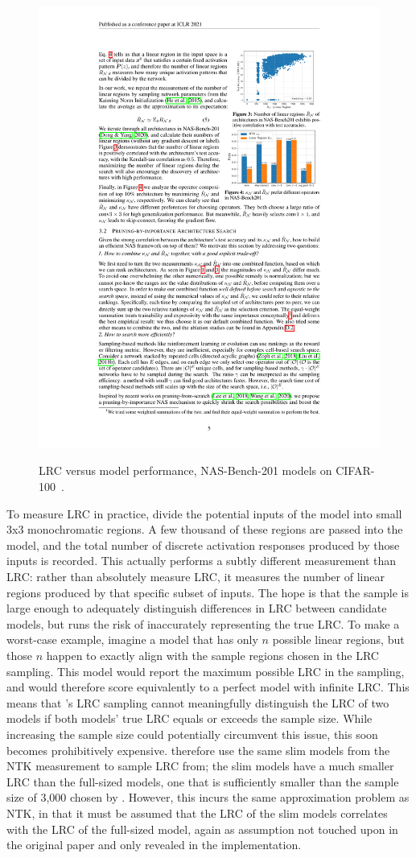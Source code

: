 \begin{figure}[ht]
    \centering
	\includegraphics[width=.4\textwidth]{lrc_corr} \\
	\caption[LRC versus model performance on NAS-Bench-201]{LRC versus model performance, NAS-Bench-201 models on CIFAR-100~\citep{chen2021}.}
    \label{fig:lrc_corr}
\end{figure}

To measure LRC in practice, \citeauthor{chen2021} divide the potential inputs of the model into small 3x3 monochromatic regions. A few
thousand of these regions are passed into the model, and the total number of discrete activation responses produced by those
inputs is recorded. This actually performs a subtly different measurement than LRC: rather than absolutely measure LRC,
it measures the number of linear regions produced by that specific subset of inputs. The hope is that the sample is large enough to adequately distinguish differences
in LRC between candidate models, but runs the risk of inaccurately representing the true LRC.
To make a worst-case example, imagine a model that has only $n$ possible linear regions, but those $n$ happen to exactly
align with the sample regions chosen in the LRC sampling. This model would report the maximum possible LRC in the sampling,
and would therefore score equivalently to a perfect model with infinite LRC. This means that \citeauthor{chen2021}'s LRC sampling
cannot meaningfully distinguish the LRC of two models if both models' true LRC equals or exceeds the sample size. While
increasing the sample size could potentially circumvent this issue, this soon becomes prohibitively expensive.
\citeauthor{chen2021} therefore use the same slim models from the NTK measurement to sample LRC from; the slim models have a much
smaller LRC than the full-sized models, one that is sufficiently smaller than the sample size of 3,000 chosen by \citeauthor{chen2021}.
However, this incurs the same approximation problem as NTK, in that it must be assumed that the LRC of the slim models correlates
with the LRC of the full-sized model, again as assumption not touched upon in the original paper and only revealed in the
implementation.

